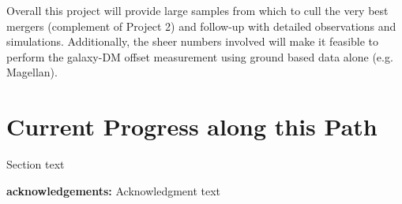 Overall this project will provide large samples from which to cull the very best mergers (complement of Project 2) and follow-up with detailed observations and simulations.  Additionally, the sheer numbers involved will make it feasible to perform the galaxy-DM offset measurement using ground based data alone (e.g. Magellan).

\section{Current Progress along this Path}

Section text


\textbf{acknowledgements:}
Acknowledgment text

%



%
%  
